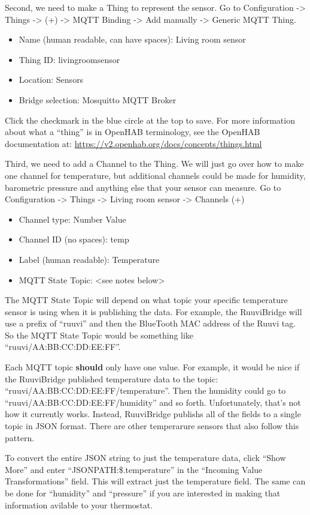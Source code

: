 Second, we need to make a Thing to represent the sensor. Go to Configuration ->
Things -> (+) -> MQTT Binding -> Add manually -> Generic MQTT Thing.

\begin{itemize}
\item Name (human readable, can have spaces): Living room sensor
\item Thing ID: livingroomsensor
\item Location: Sensors
\item Bridge selection: Mosquitto MQTT Broker
\end{itemize}

Click the checkmark in the blue circle at the top to save. For more information
about what a ``thing'' is in OpenHAB terminology, see the OpenHAB documentation
at: \url{https://v2.openhab.org/docs/concepts/things.html}

Third, we need to add a Channel to the Thing. We will just go over how to make
one channel for temperature, but additional channels could be made for humidity,
barometric pressure and anything else that your sensor can measure. Go to
Configuration -> Things -> Living room sensor -> Channels (+)

\begin{itemize}
\item Channel type: Number Value
\item Channel ID (no spaces): temp
\item Label (human readable): Temperature
\item MQTT State Topic: <see notes below>
\end{itemize}

The MQTT State Topic will depend on what topic your specific temperature sensor
is using when it is publishing the data. For example, the RuuviBridge will use
a prefix of ``ruuvi'' and then the BlueTooth MAC address of the Ruuvi tag. So
the MQTT State Topic would be something like ``ruuvi/AA:BB:CC:DD:EE:FF''.

Each MQTT topic \textbf{should} only have one value. For example, it would be
nice if the RuuviBridge published temperature data to the topic:
``ruuvi/AA:BB:CC:DD:EE:FF/temperature''. Then the humidity could go to
``ruuvi/AA:BB:CC:DD:EE:FF/humidity'' and so forth.  Unfortunately, that's not
how it currently works. Instead, RuuviBridge publishs all of the fields to a
single topic in JSON format. There are other temperarure sensors that also
follow this pattern.

To convert the entire JSON string to just the temperature data, click ``Show
More'' and enter ``JSONPATH:\$.temperature'' in the ``Incoming Value
Transformations'' field. This will extract just the temperature field. The
same can be done for ``humidity'' and ``pressure'' if you are interested in
making that information avilable to your thermostat.

